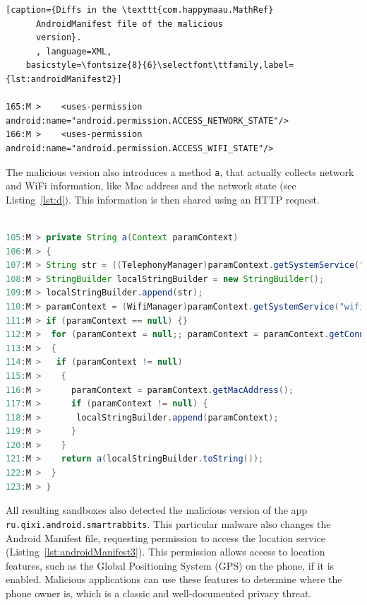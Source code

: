 \begin{lstlisting}[caption={Diffs in the \texttt{com.happymaau.MathRef}
      AndroidManifest file of the malicious
      version}.
      , language=XML,
    basicstyle=\fontsize{8}{6}\selectfont\ttfamily,label={lst:androidManifest2}]

165:M >    <uses-permission android:name="android.permission.ACCESS_NETWORK_STATE"/>
166:M >    <uses-permission android:name="android.permission.ACCESS_WIFI_STATE"/>
\end{lstlisting}


The malicious version also introduces a method \texttt{a},
that actually collects network and WiFi information, like Mac address and the network state
(see Listing~\ref{lst:d}). This information is then shared using an
HTTP request. 

\begin{lstlisting}[caption={Diffs in the malicious version
      of the class \texttt{com.mn.vymq.b.d}
      (app \texttt{com.happymaau.MathRef})},
      language=Java, basicstyle=\fontsize{8}{6}\selectfont\ttfamily,
      label={lst:d}]

105:M > private String a(Context paramContext)
106:M > {
107:M >	String str = ((TelephonyManager)paramContext.getSystemService("phone")).getDeviceId();
108:M > StringBuilder localStringBuilder = new StringBuilder();
109:M > localStringBuilder.append(str);
110:M > paramContext = (WifiManager)paramContext.getSystemService("wifi");
111:M > if (paramContext == null) {}
112:M >  for (paramContext = null;; paramContext = paramContext.getConnectionInfo())
113:M >  {
114:M >   if (paramContext != null)
115:M >    {
116:M >      paramContext = paramContext.getMacAddress();
117:M >      if (paramContext != null) {
118:M >       localStringBuilder.append(paramContext);
119:M >      }
120:M >    }
121:M >    return a(localStringBuilder.toString());
122:M >  }
123:M > }
\end{lstlisting}


All resulting sandboxes also detected the malicious version of the app \texttt{ru.qixi.android.smartrabbits}.
This particular malware also changes the Android Manifest file,
requesting permission to access the location service (Listing~\ref{lst:androidManifest3}).
This permission allows access to location features, such as the Global Positioning System (GPS) on the phone, if it is enabled. Malicious applications can use these features to determine where the phone owner is, which is a
classic and well-documented privacy threat. 

